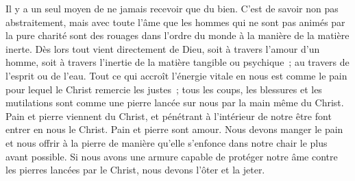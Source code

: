 \documentclass[french,twoside]{book} %
\begin{document}
Il y a un seul moyen de ne jamais recevoir que du bien. C'est de savoir non pas abstraitement, mais avec toute l'âme que les hommes qui ne sont pas animés par la pure charité sont des rouages dans l'ordre du monde à la manière de la matière inerte. Dès lors tout vient directement de Dieu, soit à travers l'amour d'un homme, soit à travers l'inertie de la matière tangible ou psychique ; au travers de l'esprit ou de l'eau. Tout ce qui accroît l'énergie vitale en nous est comme le pain pour lequel le Christ remercie les justes ; tous les coups, les blessures et les mutilations sont comme une pierre lancée sur nous par la main même du Christ. Pain et pierre viennent du Christ, et pénétrant à l'intérieur de notre être font entrer en nous le Christ. Pain et pierre sont amour. Nous devons manger le pain et nous offrir à la pierre de manière qu'elle s'enfonce dans notre chair le plus avant possible. Si nous avons une armure capable de protéger notre âme contre les pierres lancées par le Christ, nous devons l'ôter et la jeter.
\end{document}
